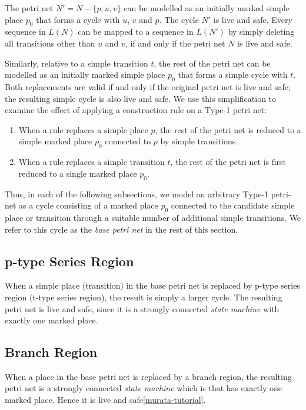 \documentclass[12pt,a4paper]{article}
\begin{document}
The petri net $N' = N - \{p,u,v\}$ can be modelled as an initially
marked simple place $p_0$ that forms a cycle with $u$, $v$ and $p$.
The cycle $N'$ is live and safe. Every sequence in $L(N)$ can be
mapped to a sequence in $L(N')$ by simply deleting all transitions
other than $u$ and $v$, if and only if the petri net $N$ is live and
safe.

Similarly, relative to a simple transition $t$, the rest of the petri
net can be modelled as an initially marked simple place $p_0$ that
forms a simple cycle with $t$. Both replacements are valid if and only
if the original petri net is live and safe; the resulting simple cycle
is also live and safe. We use this simplification to examine the
effect of applying a construction rule on a Type-1 petri net:

\begin{enumerate}
\item When a rule replaces a simple place $p$, the rest of the petri
  net is reduced to a simple marked place $p_0$ connected to $p$ by
  simple transitions.
\item When a rule replaces a simple transition $t$, the rest of the
  petri net is first reduced to a single marked place $p_0$.
\end{enumerate}

Thus, in each of the following subsections, we model an arbitrary
Type-1 petri-net as a cycle consisting of a marked place $p_0$
connected to the candidate simple place or transition through a
suitable number of additional simple transitions. We refer to this
cycle as the \emph{base petri net} in the rest of this section.

\subsection{p-type Series Region}
\label{sec:series-live-and-safe}

When a simple place (transition) in the base petri net is replaced by
p-type series region (t-type series region), the result is simply a
larger cycle. The resulting petri net is live and safe, since it is a
strongly connected \emph{state machine} with exactly one marked place.

\subsection{Branch Region}
\label{sec:branch-live-and-safe}

When a place in the base petri net is replaced by a branch region, the
resulting petri net is a strongly connected \emph{state machine} which
is that has exactly one marked place. Hence it is live and
safe\ref{murata-tutorial}.
\end{document}
